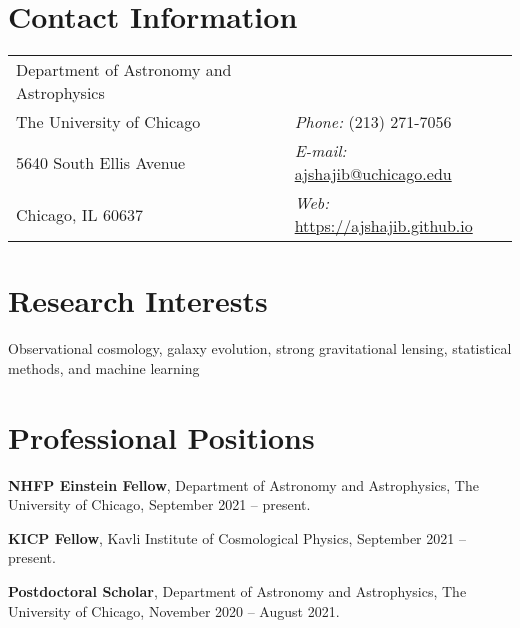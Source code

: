 \documentclass[margin, line]{res}
\newenvironment{list1}{
  \begin{list}{\ding{113}}{%
      \setlength{\itemsep}{0in}
      \setlength{\parsep}{0in} \setlength{\parskip}{0in}
      \setlength{\topsep}{0in} \setlength{\partopsep}{0in} 
      \setlength{\leftmargin}{0.17in}}}{\end{list}}
\begin{document}

\begin{resume}


\section{\sc Contact Information}
\vspace{.05in}
\begin{tabular}{@{}p{3in}p{3in}}                  
Department of Astronomy and Astrophysics  \\ %
The University of Chicago  & {\it Phone:}  (213) 271-7056 \\     
5640 South Ellis Avenue 	         & {\it E-mail:}  \href{mailto:ajshajib@astro.ucla.edu}{ajshajib@uchicago.edu} \\
Chicago, IL 60637  & {\it Web:} \url{https://ajshajib.github.io} \\   
\end{tabular}


\section{\sc Research Interests}
Observational cosmology, galaxy evolution, strong gravitational lensing,  statistical methods, and machine learning

\vspace*{2.5mm}
\section{\sc Professional Positions}

\vspace*{.16in}
\begin{list1}
	\item[] \textbf{NHFP Einstein Fellow}, Department of Astronomy and Astrophysics, The University of Chicago, September 2021 -- present.
	\item[] \textbf{KICP Fellow}, Kavli Institute of Cosmological Physics, September 2021 -- present.
	\item[] \textbf{Postdoctoral Scholar}, Department of Astronomy and Astrophysics, The University of Chicago, November 2020 -- August 2021.
\end{list1}


\end{resume}
\end{document}
